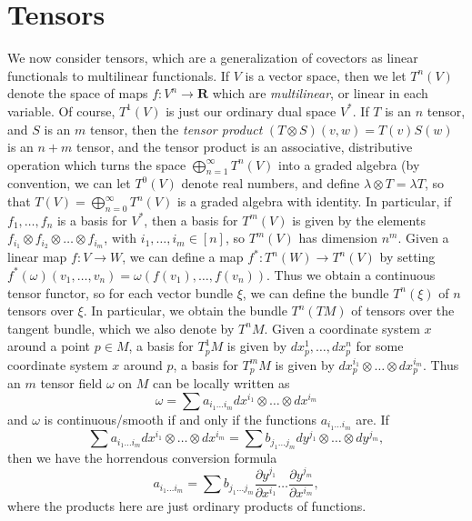 \section{Tensors}

We now consider tensors, which are a generalization of covectors as linear functionals to multilinear functionals. If $V$ is a vector space, then we let $T^n(V)$ denote the space of maps $f: V^n \to \mathbf{R}$ which are {\it multilinear}, or linear in each variable. Of course, $T^1(V)$ is just our ordinary dual space $V^*$. If $T$ is an $n$ tensor, and $S$ is an $m$ tensor, then the {\it tensor product} $(T \otimes S)(v,w) = T(v)S(w)$ is an $n + m$ tensor, and the tensor product is an associative, distributive operation which turns the space $\bigoplus_{n = 1}^\infty T^n(V)$ into a graded algebra (by convention, we can let $T^0(V)$ denote real numbers, and define $\lambda \otimes T = \lambda T$, so that $T(V) = \bigoplus_{n = 0}^\infty T^n(V)$ is a graded algebra with identity. In particular, if $f_1, \dots, f_n$ is a basis for $V^*$, then a basis for $T^m(V)$ is given by the elements $f_{i_1} \otimes f_{i_2} \otimes \dots \otimes f_{i_m}$, with $i_1, \dots, i_m \in [n]$, so $T^m(V)$ has dimension $n^m$. Given a linear map $f: V \to W$, we can define a map $f^*: T^n(W) \to T^n(V)$ by setting $f^*(\omega)(v_1, \dots, v_n) = \omega(f(v_1), \dots, f(v_n))$. Thus we obtain a continuous tensor functor, so for each vector bundle $\xi$, we can define the bundle $T^n(\xi)$ of $n$ tensors over $\xi$. In particular, we obtain the bundle $T^n(TM)$ of tensors over the tangent bundle, which we also denote by $T^nM$. Given a coordinate system $x$ around a point $p \in M$, a basis for $T^1_p M$ is given by $dx^1_p, \dots, dx^n_p$ for some coordinate system $x$ around $p$, a basis for $T^m_pM$ is given by $dx^{i_1}_p \otimes \dots \otimes dx^{i_m}_p$. Thus an $m$ tensor field $\omega$ on $M$ can be locally written as
%
\[ \omega = \sum a_{i_1 \dots i_m} dx^{i_1} \otimes \dots \otimes dx^{i_m} \]
%
and $\omega$ is continuous/smooth if and only if the functions $a_{i_1 \dots i_m}$ are. If
%
\[ \sum a_{i_1 \dots i_m} dx^{i_1} \otimes \dots \otimes dx^{i_m} = \sum b_{j_1 \dots j_m} dy^{j_1} \otimes \dots \otimes dy^{j_m}, \]
%
then we have the horrendous conversion formula
%
\[ a_{i_1 \dots i_m} = \sum b_{j_1 \dots j_m} \frac{\partial y^{j_1}}{\partial x^{i_1}} \dots \frac{\partial y^{j_m}}{\partial x^{i_m}}, \]
%
where the products here are just ordinary products of functions.

